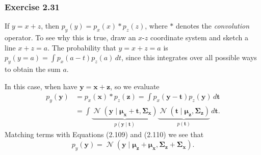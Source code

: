 \documentclass[12pt, a4paper]{article}
\newcommand{\vect}[1]{\bm{#1}}
\DeclareMathOperator{\N}{\mathcal{N}}
\begin{document}
\subsubsection*{Exercise 2.31}
If $y = x + z$, then $p_y(y) = p_x(x) * p_z(z)$, where $*$ denotes the \emph{convolution} operator.
To see why this is true, draw an $x$-$z$ coordinate system and sketch a line $x + z = a$.
The probability that $y = x + z = a$ is $p_y(y=a) = \int p_x(a - t) p_z(a) \, dt$, since this integrates over all possible ways to obtain the sum $a$.

In this case, when have $\vect{y} = \vect{x} + \vect{z}$, so we evaluate
\begin{align*}
	p_y(\vect{y}) &= p_x(\vect{x}) * p_z(\vect{z}) = 
	\int p_x(\vect{y} - \vect{t}) p_z(\vect{y}) \, d \vect{t} \\
	&=
	\int 
	\underbrace{\N \left( \vect{y} \mid \vect{\mu}_{\vect{x}} + \vect{t} , \vect{\Sigma}_{\vect{x}} \right) }_{p(\vect{y} \mid \vect{t})}
	\underbrace{\N \left( \vect{t} \mid \vect{\mu}_{\vect{z}} , \vect{\Sigma}_{\vect{z}} \right)}_{p(\vect{t})}
	 \, d \vect{t}.
\end{align*}
Matching terms with Equations (2.109) and (2.110) we see that
\begin{equation*}
	p_y(\vect{y}) = \N \left( \vect{y} \mid 
	\vect{\mu}_{\vect{z}} + \vect{\mu}_{\vect{x}}
	, \vect{\Sigma}_{\vect{z}} + \vect{\Sigma}_{\vect{x}} \right).
\end{equation*}
\end{document}
